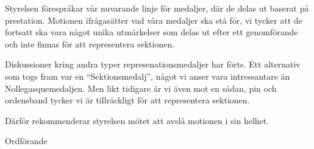 \documentclass[../_main/handlingar.tex]{subfiles}
\begin{document}
\motionssvar

Styrelsen förespråkar vår nuvarande linje för medaljer, där de delas ut baserat på prestation. 
Motionen ifrågasätter vad våra medaljer ska stå för, vi tycker att de fortsatt ska vara något unika utmärkelser som delas ut efter ett genomförande och inte finnas för att representera sektionen. 

Diskussioner kring andra typer represenationsmedaljer har förts. Ett alternativ som togs fram var en “Sektionsmedalj”, något vi anser vara intressantare än Nollegasquemedaljen. Men likt tidigare är vi även mot en sådan, pin och ordensband tycker vi är tillräckligt för att representera sektionen.

Därför rekommenderar styrelsen mötet att avslå motionen i sin helhet.


\begin{signatures}{1}
    \ist
    \signature{\ordf}{Ordförande}
\end{signatures}
\end{document}
